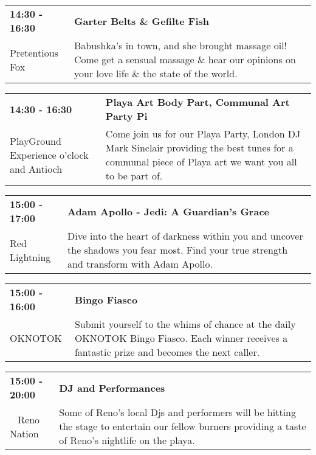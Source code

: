 \begin{tabular}{ p{1in} p{2.2in} }
    \textbf{14:30 - 16:30} & \textbf{Garter Belts \& Gefilte Fish} \\
    Pretentious Fox \newline  & Babushka's in town, and she brought massage oil! Come get a sensual massage \& hear our opinions on your love life \& the state of the world. \\
    \hline 
\end{tabular}
    
\begin{tabular}{ p{1in} p{2.2in} }
    \textbf{14:30 - 16:30} & \textbf{ Playa Art Body Part, Communal Art Party Pi} \\
    PlayGround Experience \newline 2 o'clock and Antioch & Come join us for our Playa Party, London DJ Mark Sinclair providing the best tunes for a communal piece of Playa art we want you all to be part of. \\
    \hline 
\end{tabular}
    
\begin{tabular}{ p{1in} p{2.2in} }
    \textbf{15:00 - 17:00} & \textbf{Adam Apollo - Jedi: A Guardian's Grace} \\
    Red Lightning \newline  & Dive into the heart of darkness within you and uncover the shadows you fear most. Find your true strength and transform with Adam Apollo. \\
    \hline 
\end{tabular}
    
\begin{tabular}{ p{1in} p{2.2in} }
    \textbf{15:00 - 16:00} & \textbf{Bingo Fiasco} \\
    OKNOTOK \newline  & Submit yourself to the whims of chance at the daily OKNOTOK Bingo Fiasco. Each winner receives a fantastic prize and becomes the next caller. \\
    \hline 
\end{tabular}
    
\begin{tabular}{ p{1in} p{2.2in} }
    \textbf{15:00 - 20:00} & \textbf{DJ and Performances} \\
    ~ \newline Reno Nation & Some of Reno's local Djs and performers will be hitting the stage to entertain our fellow burners providing a taste of Reno's nightlife on the playa. \\
    \hline 
\end{tabular}
    
